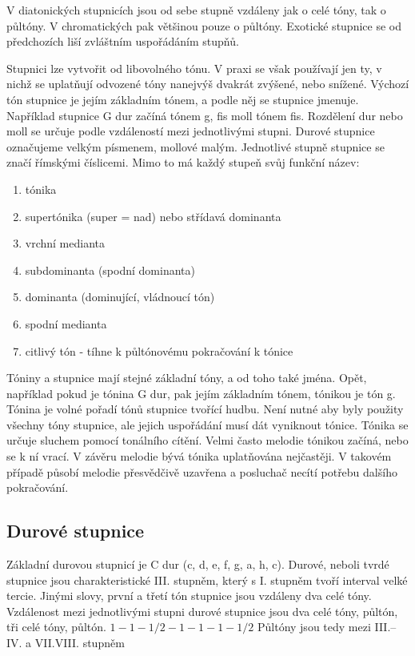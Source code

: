 V diatonických stupnicích jsou od sebe stupně vzdáleny jak o celé tóny, tak o půltóny.
V chromatických pak většinou pouze o půltóny.
Exotické stupnice se od předchozích liší zvláštním uspořádáním stupňů.
\cite{kofron}
\par

Stupnici lze vytvořit od libovolného tónu.
V praxi se však používají jen ty, 
v nichž se uplatňují odvozené tóny nanejvýš dvakrát zvýšené, nebo snížené.
Výchozí tón stupnice je jejím základním tónem, a podle něj se stupnice jmenuje.
Například stupnice G dur začíná tónem g, fis moll tónem fis.
Rozdělení dur nebo moll se určuje podle vzdáleností mezi jednotlivými stupni.
\cite{zenkl}
Durové stupnice označujeme velkým písmenem, mollové malým.
Jednotlivé stupně stupnice se značí římskými číslicemi.
Mimo to má každý stupeň svůj funkční název:
\cite{kofron}

\begin{enumerate} [label=\Roman*]
    \item tónika
    \item supertónika (super = nad) nebo střídavá dominanta
    \item vrchní medianta
    \item subdominanta (spodní dominanta)
    \item dominanta (dominující, vládnoucí tón)
    \item spodní medianta
    \item citlivý tón - tíhne k půltónovému pokračování k tónice
\end{enumerate}
\par

Tóniny a stupnice mají stejné základní tóny, a od toho také jména.
Opět, například pokud je tónina G dur, pak jejím základním tónem, tónikou je tón g.
Tónina je volné pořadí tónů stupnice tvořící hudbu.
Není nutné aby byly použity všechny tóny stupnice, 
ale jejich uspořádání musí dát vyniknout tónice.
Tónika se určuje sluchem pomocí tonálního cítění.
Velmi často melodie tónikou začíná, nebo se k ní vrací.
V závěru melodie bývá tónika uplatňována nejčastěji.
V takovém případě působí melodie přesvědčivě uzavřena 
a posluchač necítí potřebu dalšího pokračování.
\cite{zenkl}
\par

\subsection{Durové stupnice}
Základní durovou stupnicí je C dur (c, d, e, f, g, a, h, c).
Durové, neboli tvrdé stupnice jsou charakteristické III. stupněm,
který s I. stupněm tvoří interval velké tercie.
Jinými slovy, první a třetí tón stupnice jsou vzdáleny dva celé tóny.
Vzdálenost mezi jednotlivými stupni durové stupnice jsou dva celé tóny, půltón, tři celé tóny, půltón.
$ 1 - 1 - 1/2 - 1 - 1 - 1 - 1/2 $
Půltóny jsou tedy mezi III.--IV. a VII.VIII. stupněm


